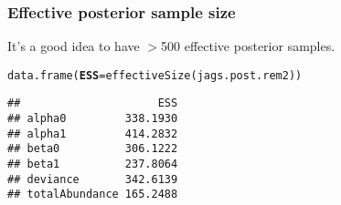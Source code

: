 \documentclass[color=usenames,dvipsnames]{beamer}\usepackage[]{graphicx}\usepackage[]{xcolor}
\makeatletter
\newcommand{\hldef}[1]{\textcolor[rgb]{0,0,0}{#1}}%
\newcommand{\hlkwc}[1]{\textcolor[rgb]{0,0,0}{\textbf{#1}}}%
\newcommand{\hlkwd}[1]{\textcolor[rgb]{0.004,0.004,0.506}{#1}}%
\newenvironment{kframe}{%
 \def\at@end@of@kframe{}%
 \ifinner\ifhmode%
  \def\at@end@of@kframe{\end{minipage}}%
  \begin{minipage}{\columnwidth}%
 \fi\fi%
 \def\FrameCommand##1{\hskip\@totalleftmargin \hskip-\fboxsep
 \colorbox{shadecolor}{##1}\hskip-\fboxsep
     \hskip-\linewidth \hskip-\@totalleftmargin \hskip\columnwidth}%
 \MakeFramed {\advance\hsize-\width
   \@totalleftmargin\z@ \linewidth\hsize
   \@setminipage}}%
 {\par\unskip\endMakeFramed%
 \at@end@of@kframe}
\newenvironment{knitrout}{}{} %
\makeatother
\begin{document}
\begin{frame}[fragile]
  \frametitle{Effective posterior sample size}
  It's a good idea to have $>$500 effective posterior samples. 
\begin{knitrout}\small
{}\color{fgcolor}\begin{kframe}
\begin{alltt}
\hlkwd{data.frame}\hldef{(}\hlkwc{ESS} \hldef{=} \hlkwd{effectiveSize}\hldef{(jags.post.rem2))}
\end{alltt}
\begin{verbatim}
##                     ESS
## alpha0         338.1930
## alpha1         414.2832
## beta0          306.1222
## beta1          237.8064
## deviance       342.6139
## totalAbundance 165.2488
\end{verbatim}
\end{kframe}
\end{knitrout}
\end{frame}











\end{document}
